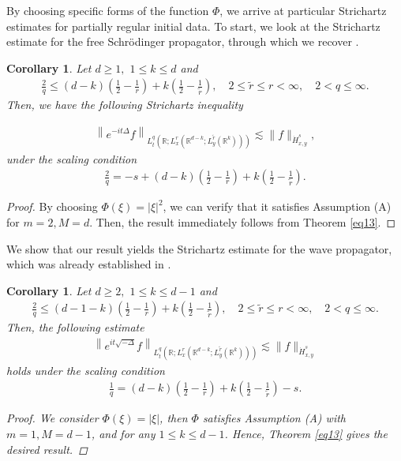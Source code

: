 \documentclass[a4paper,11pt, reqno]{amsart}
\newtheorem{cor}[theorem]{Corollary}
\theoremstyle{definition}
\theoremstyle{remark}
\numberwithin{equation}{section}
\begin{document}
	 By choosing specific forms of the function $\Phi$, we arrive at particular Strichartz estimates for partially regular initial data. To start, we look at the Strichartz estimate for the free Schrödinger propagator, through which we recover \cite[Theorem 1.3]{KLS23}.
     
    \begin{cor} Let $d \geq 1,$ $1 \leq k \leq d$ and \begin{align*}
				\frac{2}{q} \leq(d-k)\left(\frac{1}{2}-\frac{1}{r}\right)+k\left(\frac{1}{2}-\frac{1}{\widetilde{r}}\right), \quad 2 \leq \widetilde{r} \leq r<\infty, \quad 2<q \leq \infty. 
			\end{align*} Then, we have the following Strichartz inequality 
      
			\begin{align*}
				\left\|e^{-i t \Delta} f\right\|_{L_t^q\left(\mathbb{R} ; L_x^r\left(\mathbb{R}^{d-k} ; L_y^{\tilde{r}}\left(\mathbb{R}^k\right)\right)\right)} \lesssim \|f\|_{\dot{H}_{x, y}^s},
			\end{align*}
			under the scaling condition
			\begin{align*}
				\frac{{{2}}}{q}=-s+(d-k)\left(\frac{1}{2}-\frac{1}{r}\right)+k\left(\frac{1}{2}-\frac{1}{\widetilde{r}}\right).
			\end{align*}
    \end{cor}
    \begin{proof} By choosing $\Phi(\xi)=|\xi|^2$, we can verify that it satisfies Assumption (A) for $m=2, M=d.$ Then, the result immediately follows from  Theorem \ref{eq13}.  
    \end{proof}
   

We show that our result yields the Strichartz estimate for the wave propagator, which was already established in \cite[Theorem 1.3]{KLS23}.

\begin{cor} Let $d \geq 2,$ $1 \leq k \leq d-1$ and \begin{align*}
				\frac{2}{q} \leq(d-1-k)\left(\frac{1}{2}-\frac{1}{r}\right)+k\left(\frac{1}{2}-\frac{1}{\widetilde{r}}\right), \quad 2 \leq \widetilde{r} \leq r<\infty, \quad 2<q \leq \infty.
			\end{align*}
Then, the following estimate 
			\begin{align*}
				\left\|e^{i t \sqrt{-\Delta}} f\right\|_{L_t^q\left(\mathbb{R} ; L_x^r\left(\mathbb{R}^{d-k} ; L_y^{\tilde{r}}\left(\mathbb{R}^k\right)\right)\right)} \lesssim \|f\|_{\dot{H}_{x, y}^s}
			\end{align*}
			holds  
			under  the scaling condition
			\begin{align*}
				\frac{{{1}}}{q}=(d-k)\left(\frac{1}{2}-\frac{1}{r}\right)+k\left(\frac{1}{2}-\frac{1}{\widetilde{r}}\right)-s.
			\end{align*}
\begin{proof} We consider  $\Phi(\xi)=|\xi|$, then $\Phi$ satisfies Assumption (A) with  $m=1, M=d-1$,  and  for any $1 \leq k \leq d-1$. Hence, Theorem \ref{eq13} gives the desired result.   \end{proof}
             \end{cor}
\end{document}
